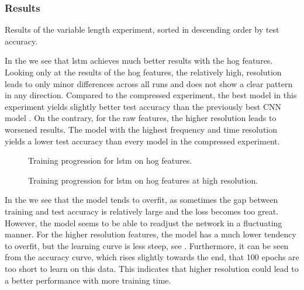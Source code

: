 \subsubsection{Results}
\begin{table}[ht!]
\centering

\caption{Results of the variable length experiment, sorted in descending order by test accuracy.}
\label{tab:result_overview_sct_vl}
\end{table}
In the  we see that \gls{lstm} achieves much better results with the \gls{hog} features. Looking only at the results of the \gls{hog} features, the relatively high, resolution leads to only minor differences across all runs and does not show a clear pattern in any direction.
Compared to the compressed experiment, the best model in this experiment \cite{nn_lstm_sct_vl_xpps5000_h512_hog_100} yields slightly better test accuracy than the previously best CNN model \cite{nn_densNet_sct_compressed_nrs0_raw_100}.
On the contrary, for the raw features, the higher resolution leads to worsened results.
The model with the highest frequency and time resolution \cite{nn_lstm_sct_vl_xpps5000_h512_raw_100} yields a lower test accuracy than every model in the compressed experiment.

\begin{figure}[ht!]
\centering
  \hfill
  \caption{Training progression for \gls{lstm} on \gls{hog} features.}
  \label{fig:train_val_sct_vl_best_lstm}
\end{figure}

\begin{figure}[ht!]
\centering
  \hfill
  \caption{Training progression for \gls{lstm} on \gls{hog} features at high resolution.}
  \label{fig:train_val_sct_vl_xpps5000_h512_hog_100}
\end{figure}

In the  we see that the model \cite{nn_lstm_sct_vl_xpps4000_h300_hog_100} tends to overfit, as sometimes the gap between training and test accuracy is relatively large and the loss becomes too great.
However, the model seems to be able to readjust the network in a fluctuating manner.
For the higher resolution features, the model has a much lower tendency to overfit, but the learning curve is less steep, see .
Furthermore, it can be seen from the accuracy curve, which rises slightly towards the end, that 100 epochs are too short to learn on this data. This indicates that higher resolution could lead to a better performance with more training time.

